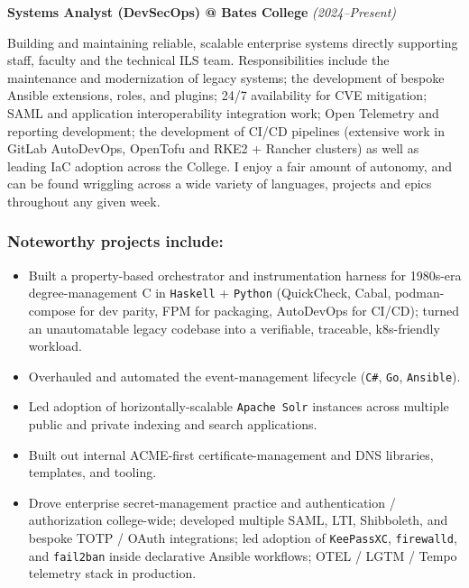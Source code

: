 \documentclass[11pt,letterpaper]{article}
\newcommand{\role}[2]{%
    \noindent\textbf{\color{secondary}#1} \hfill \textit{\color{muted}(#2)}\par\vspace{0.3em}
}
\newcommand{\tech}[1]{\texttt{\small\color{secondary}#1}}
\begin{document}
\role{Systems Analyst (DevSecOps) @ Bates College}{2024--Present}

Building and maintaining reliable, scalable enterprise systems directly supporting staff, faculty and the technical ILS team. Responsibilities include the maintenance and modernization of legacy systems; the development of bespoke Ansible extensions, roles, and plugins; 24/7 availability for CVE mitigation; SAML and application interoperability integration work; Open Telemetry and reporting development; the development of CI/CD pipelines (extensive work in GitLab AutoDevOps, OpenTofu and RKE2 + Rancher clusters) as well as leading IaC adoption across the College. I enjoy a fair amount of autonomy, and can be found wriggling across a wide variety of languages, projects and epics throughout any given week.

\subsubsection{Noteworthy projects include:}
\begin{itemize}
    \item Built a property-based orchestrator and instrumentation harness for 1980s-era degree-management C in \tech{Haskell} + \tech{Python} (QuickCheck, Cabal, podman-compose for dev parity, FPM for packaging, AutoDevOps for CI/CD); turned an unautomatable legacy codebase into a verifiable, traceable, k8s-friendly workload.
    \item Overhauled and automated the event-management lifecycle (\tech{C\#}, \tech{Go}, \tech{Ansible}).
    \item Led adoption of horizontally-scalable \tech{Apache Solr} instances across multiple public and private indexing and search applications.
    \item Built out internal ACME-first certificate-management and DNS libraries, templates, and tooling.
    \item Drove enterprise secret-management practice and authentication / authorization college-wide; developed multiple SAML, LTI, Shibboleth, and bespoke TOTP / OAuth integrations; led adoption of \tech{KeePassXC}, \tech{firewalld}, and \tech{fail2ban} inside declarative Ansible workflows; OTEL / LGTM / Tempo telemetry stack in production.
\end{itemize}

\newpage
\end{document}
